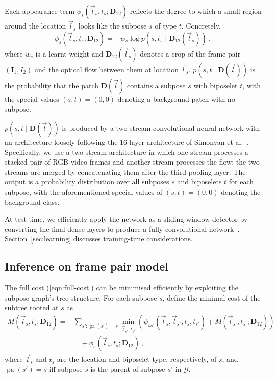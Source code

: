 \documentclass[runningheads]{llncs}
\newcommand{\mat}{\mathbf}
\DeclareMathOperator{\pa}{pa}
\begin{document}
Each appearance term $\phi_s(\vec l_s, t_s; \mat D_{12})$ reflects the degree to
which a small region around the location $\vec l_s$ looks like the subpose $s$
of type $t$. Concretely,
\begin{equation}\label{eqn:unary-cost}
\phi_s(\vec l_s, t_s; \mat D_{12}) = -w_s \log p(s, t_s \mid \mat D_{12}(
\vec l_s))~,
\end{equation}
%
where $w_s$ is a learnt weight and $\mat D_{12}(\vec l_s)$ denotes a crop of the
frame pair $(\mat I_1, I_2)$ and the optical flow between them at location
$\vec l_s$. $p(s, t \mid \mat D(\vec l))$ is the probability that the patch
$\mat D(\vec l)$ contains a subpose $s$ with biposelet $t$, with the special
values $(s, t) = (0, 0)$ denoting a background patch with no subpose.

$p(s, t \mid \mat D(\vec l))$ is produced by a two-stream convolutional neural
network with an architecture loosely following the 16 layer architecture of
Simonyan et al.~\cite{simonyan2014very}. Specifically, we use a two-stream
architecture in which one stream processes a stacked pair of RGB video frames
and another stream processes the flow; the two streams are merged by
concatenating them after the third pooling layer. The output is a probability
distribution over all subposes $s$ and biposelets $t$ for each subpose, with the
aforementioned special values of $(s, t) = (0, 0)$ denoting the background
class.

At test time, we efficiently apply the network as a sliding window detector by
converting the final dense layers to produce a fully convolutional
network~\cite{sermanet2013overfeat}. Section~\ref{sec:learning} discusses
training-time considerations.

\subsection{Inference on frame pair model}

The full cost (\ref{eqn:full-cost}) can be minimised efficiently by exploiting
the subpose graph's tree structure. For each subpose $s$, define the minimal
cost of the subtree rooted at $s$ as
%
\begin{equation}\label{eqn:reccost}
\begin{split}
M(\vec l_s, t_s; \mat D_{12}) =
&\sum_{s' : \pa(s') = s} \min_{\vec l_{s'}, t_{s'}} \left(\psi_{s s'}(\vec l_s,
\vec l_{s'}, t_s, t_{s'}) + M(\vec l_{s'}, t_{s'}; \mat D_{12})\right)
\\&\quad+ \phi_s(\vec l_s, t_s; \mat D_{12})~,
\end{split}
\end{equation}
%
where $\vec l_s$ and $t_s$ are the location and biposelet type, respectively, of
$s$, and $\pa(s') = s$ iff subpose $s$ is the parent of subpose $s'$ in
$\mathcal G$.
\end{document}
